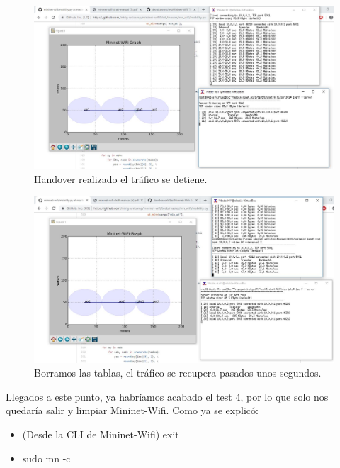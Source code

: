\begin{figure}[!htb]
  \centering
    \includegraphics[width=\linewidth]{./img/test/26.JPG}
    \caption{Handover realizado el tráfico se detiene.}
  \label{fig:yo}
\end{figure}
\newpage
\begin{figure}[!htb]
  \centering
    \includegraphics[width=\linewidth]{./img/test/27.JPG}
    \caption{Borramos las tablas, el tráfico se recupera pasados unos segundos.}
  \label{fig:yo}
\end{figure}
Llegados a este punto, ya habríamos acabado el test 4, por lo que solo nos quedaría salir y limpiar Mininet-Wifi. Como ya se explicó:
\begin{itemize}
    \item (Desde la CLI de Mininet-Wifi) exit
    \item  sudo mn -c
\end{itemize}